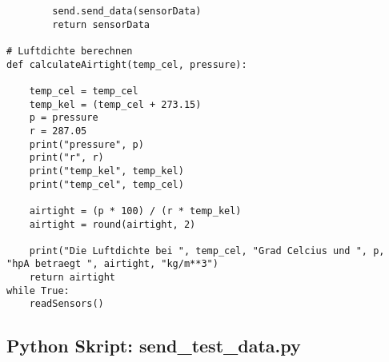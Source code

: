 \begin{lstlisting}
        send.send_data(sensorData)
        return sensorData

# Luftdichte berechnen
def calculateAirtight(temp_cel, pressure):

    temp_cel = temp_cel
    temp_kel = (temp_cel + 273.15)
    p = pressure
    r = 287.05
    print("pressure", p)
    print("r", r)
    print("temp_kel", temp_kel)
    print("temp_cel", temp_cel)

    airtight = (p * 100) / (r * temp_kel)
    airtight = round(airtight, 2)

    print("Die Luftdichte bei ", temp_cel, "Grad Celcius und ", p, "hpA betraegt ", airtight, "kg/m**3")
    return airtight
while True:
    readSensors()
\end{lstlisting}

\subsection{Python Skript: send\_test\_data.py}

